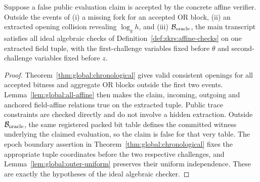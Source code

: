 \begin{lemma}\label{lem:global:good-ideal}
Suppose a false public evaluation claim is
accepted by the concrete affine verifier.
Outside the events of (i) a missing
fork for an accepted OR block,
(ii) an extracted opening collision
revealing $\log_g h$, and
(iii) $\mathcal B_{\rm oracle}$,
the main transcript satisfies all ideal
algebraic checks of
Definition~\ref{def:zkrs:affine-checks}
on one extracted field tuple, with
the first-challenge variables fixed
before $\theta$ and second-challenge
variables fixed before $z$.
\end{lemma}
\begin{proof}
Theorem~\ref{thm:global:chronological}
gives valid consistent openings
for all accepted bitness and aggregate
OR blocks outside the first two events.
Lemma~\ref{lem:global:all-affine}
then makes the claim, incoming,
outgoing and anchored field-affine
relations true on the extracted tuple.
Public trace constraints are checked
directly and do not involve a hidden
extraction. Outside
$\mathcal B_{\rm oracle}$, the same
registered packed bit table defines
the committed witness underlying the
claimed evaluation, so the claim is
false for that very table.
The epoch boundary assertion in
Theorem~\ref{thm:global:chronological}
fixes the appropriate tuple coordinates
before the two respective challenges,
and Lemma~\ref{lem:global:outer-uniform}
preserves their uniform independence.
These are exactly the hypotheses
of the ideal algebraic checker.
\end{proof}

